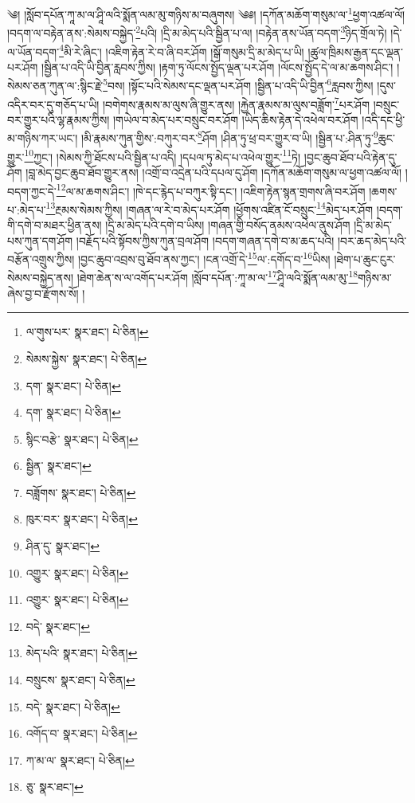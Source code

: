 \setcounter{footnote}{0} 
༄། །སློབ་དཔོན་ཀཱ་མ་ལ་ཤཱི་ལའི་སྨོན་ལམ་མུ་གཉིས་མ་བཞུགས། ༄༅། །དཀོན་མཆོག་གསུམ་ལ་\footnote{ལ་གུས་པར་  སྣར་ཐང་།  པེ་ཅིན། }ཕྱག་འཚལ་ལོ། །བདག་ལ་བརྟེན་ནས་:སེམས་བསྐྱེད་\footnote{སེམས་སྐྱེས་  སྣར་ཐང་།  པེ་ཅིན། }པའི། །དྲི་མ་མེད་པའི་སྦྱིན་པ་ལ། །བརྟེན་ནས་ཡོན་བདག་\footnote{དག་  སྣར་ཐང་།  པེ་ཅིན། }ཉིད་གྲོལ་ཏེ། །དེ་ལ་ཡོན་བདག་\footnote{དག་  སྣར་ཐང་།  པེ་ཅིན། }མི་རེ་ཞིང་། །འཇིག་རྟེན་རེ་བ་ཞི་བར་ཤོག །སྒོ་གསུམ་དྲི་མ་མེད་པ་ཡི། །ཚུལ་ཁྲིམས་རྒྱན་དང་ལྡན་པར་ཤོག །སྦྱིན་པ་འདི་ཡི་བྱིན་རླབས་ཀྱིས། །རྟག་ཏུ་ལོངས་སྤྱོད་ལྡན་པར་ཤོག །ལོངས་སྤྱོད་དེ་ལ་མ་ཆགས་ཤིང་། །སེམས་ཅན་ཀུན་ལ་:སྙིང་རྗེ་\footnote{སྙིང་བརྩེ་  སྣར་ཐང་།  པེ་ཅིན། }བས། །སྟོང་པའི་སེམས་དང་ལྡན་པར་ཤོག །སྦྱིན་པ་འདི་ཡི་བྱིན་\footnote{སྦྱིན་  སྣར་ཐང་། }རླབས་ཀྱིས། །དུས་འདིར་བར་དུ་གཅོད་པ་ཡི། །བགེགས་རྣམས་མ་ལུས་ཞི་གྱུར་ནས། །རྐྱེན་རྣམས་མ་ལུས་བཟློག་\footnote{བཟློགས་  སྣར་ཐང་།  པེ་ཅིན། }པར་ཤོག །བསྲུང་བར་གྱུར་པའི་ལྷ་རྣམས་ཀྱིས། །གཡེལ་བ་མེད་པར་བསྲུང་བར་ཤོག །ཡིད་ཆིས་རྟེན་དེ་འཕེལ་བར་ཤོག །འདི་དང་ཕྱི་མ་གཉིས་ཀར་ཡང་། །མི་རྣམས་ཀུན་གྱིས་:བཀུར་བར་\footnote{ཁུར་བར་  སྣར་ཐང་།  པེ་ཅིན། }ཤོག །ཤིན་ཏུ་ཕྲ་བར་གྱུར་བ་ཡི། །སྦྱིན་པ་:ཤིན་ཏུ་\footnote{ཤིན་དུ་  སྣར་ཐང་། }ཆུང་གྱུར་\footnote{འགྱུར་  སྣར་ཐང་།  པེ་ཅིན། }ཀྱང་། །སེམས་ཀྱི་ཐོངས་པའི་སྦྱིན་པ་འདི། །དཔལ་ཏུ་མེད་པ་འཕེལ་གྱུར་\footnote{འགྱུར་  སྣར་ཐང་།  པེ་ཅིན། }ཏེ། །བྱང་ཆུབ་ཐོབ་པའི་རྟེན་དུ་ཤོག །བླ་མེད་བྱང་ཆུབ་ཐོབ་གྱུར་ནས། །འགྲོ་བ་འདྲེན་པའི་དཔལ་དུ་ཤོག །དཀོན་མཆོག་གསུམ་ལ་ཕྱག་འཚལ་ལོ། །བདག་ཀྱང་དེ་\footnote{བདེ་  སྣར་ཐང་། }ལ་མ་ཆགས་ཤིང་། །ཁེ་དང་རྙེད་པ་བཀུར་སྟི་དང་། །འཇིག་རྟེན་སྙན་གྲགས་ཞི་བར་ཤོག །ཆགས་པ་:མེད་པ་\footnote{མེད་པའི་  སྣར་ཐང་།  པེ་ཅིན། }རྔམས་སེམས་ཀྱིས། །གཞན་ལ་རེ་བ་མེད་པར་ཤོག །ཕྱོགས་འཛིན་ངོ་བསྲུང་\footnote{བསྲུངས་  སྣར་ཐང་།  པེ་ཅིན། }མེད་པར་ཤོག །བདག་གི་དགེ་བ་མཐར་ཕྱིན་ནས། །དྲི་མ་མེད་པའི་དགེ་བ་ཡིས། །གཞན་གྱི་བསོད་ནམས་འཕེལ་ནུས་ཤོག །དྲི་མ་མེད་པས་ཀུན་དག་ཤོག །བརྗོད་པའི་སྟོབས་ཀྱིས་ཀུན་བྲལ་ཤོག །བདག་གཞན་དགེ་བ་མ་ཆད་པའི། །བར་ཆད་མེད་པའི་བརྩོན་འགྲུས་ཀྱིས། །བྱང་ཆུབ་འབྲས་བུ་ཐོབ་ནས་ཀྱང་། །ངན་འགྲོ་དེ་\footnote{བདེ་  སྣར་ཐང་།  པེ་ཅིན། }ལ་:དགོད་བ་\footnote{འགོད་བ་  སྣར་ཐང་།  པེ་ཅིན། }ཡིས། །ཐེག་པ་ཆུང་ངུར་སེམས་བསྐྱེད་ནས། །ཐེག་ཆེན་ས་ལ་འགོད་པར་ཤོག །སློབ་དཔོན་:ཀཱ་མ་ལ་\footnote{ཀ་མ་ལ་  སྣར་ཐང་།  པེ་ཅིན། }ཤཱི་ལའི་སྨོན་ལམ་མུ་\footnote{ཅུ་  སྣར་ཐང་། }གཉིས་མ་ཞེས་བྱ་བ་རྫོགས་སོ། ། 